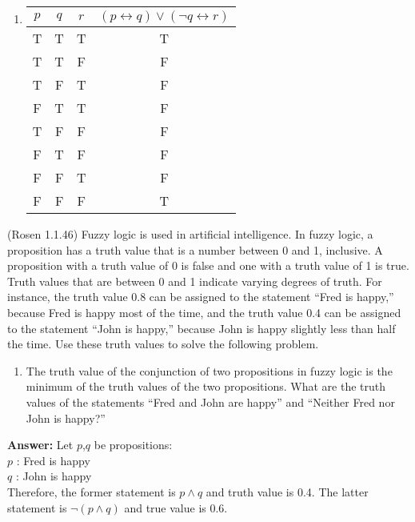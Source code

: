 \documentclass[10pt]{exam}
\begin{document}
\begin{questions}
\begin{enumerate}
    \item 
  \begin{table}[!ht]
  \centering 
  \begin{tabular}{|c|c|c|c|}
  \hline
  $p$ & $q$ & $r$ & $(p \leftrightarrow q) \lor (\neg q \leftrightarrow r)$ \\
  \hline
  T & T & T & T\\
  T & T & F & F\\
  T & F & T & F\\
  F & T & T & F\\
  T & F & F & F\\
  F & T & F & F\\
  F & F & T & F\\
  F & F & F & T\\
  \hline
  \end{tabular}
  \end{table}

\end{enumerate}



\question[3] (Rosen 1.1.46) Fuzzy logic is used in artificial intelligence. In fuzzy logic, a proposition has a truth value that is a number between 0 and 1, inclusive. A proposition with a truth value of 0 is false and one with a truth value of 1 is true. Truth values that are between 0 and 1 indicate varying degrees of truth. For instance, the truth value 0.8 can be assigned to the statement ``Fred is happy,'' because Fred is happy most of the time, and the truth value 0.4 can be assigned to the statement ``John is happy,'' because John is happy slightly less than half the time. Use these truth values to solve the following problem.

\begin{enumerate} [label=(\alph*)]
  \item The truth value of the conjunction of two propositions in fuzzy logic is the minimum of the truth values of the two propositions. What are the truth values of the statements ``Fred and John are happy'' and ``Neither Fred nor John is happy?''
  \end{enumerate}

\textbf {Answer:}
Let $p$,$q$ be propositions:\\
$p$ : Fred is happy\\
$q$ : John is happy\\

Therefore, the former statement is $p \land q$ and truth value is 0.4. The latter statement is $\neg (p \land q)$ and true value is 0.6.


\end{questions}
\end{document}
